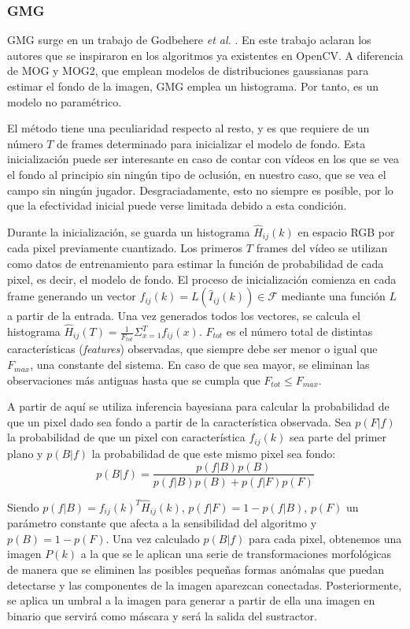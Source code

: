 \subsubsection*{GMG}
GMG surge en un trabajo de Godbehere \textit{et al.} \cite{art:Godbehere}. En este trabajo aclaran los autores que se inspiraron en los algoritmos ya existentes en OpenCV. A diferencia de MOG y MOG2, que emplean modelos de distribuciones gaussianas para estimar el fondo de la imagen, GMG emplea un histograma. Por tanto, es un modelo no paramétrico.

El método tiene una peculiaridad respecto al resto, y es que requiere de un número $T$ de frames determinado para inicializar el modelo de fondo. Esta inicialización puede ser interesante en caso de contar con vídeos en los que se vea el fondo al principio sin ningún tipo de oclusión, en nuestro caso, que se vea el campo sin ningún jugador. Desgraciadamente, esto no siempre es posible, por lo que la efectividad inicial puede verse limitada debido a esta condición.

Durante la inicialización, se guarda un histograma $\hat{H}_{ij}(k)$ en espacio RGB por cada pixel previamente cuantizado. Los primeros $T$ frames del vídeo se utilizan como datos de entrenamiento para estimar la función de probabilidad de cada pixel, es decir, el modelo de fondo. El proceso de inicialización comienza en cada frame generando un vector $f_{ij}(k) = L(\hat{I}_{ij}(k)) \in \mathcal{F}$ mediante una función $L$ a partir de la entrada. Una vez generados todos los vectores, se calcula el histograma $\hat{H}_{ij}(T) = \frac{1}{F_{tot}}\Sigma_{x = 1}^T f_{ij}(x)$. $F_{tot}$ es el número total de distintas características (\textit{features}) observadas, que siempre debe ser menor o igual que $F_{max}$, una constante del sistema. En caso de que sea mayor, se eliminan las observaciones más antiguas hasta que se cumpla que $F_{tot} \leq F_{max}$.

A partir de aquí se utiliza inferencia bayesiana para calcular la probabilidad de que un pixel dado sea fondo a partir de la característica observada. Sea $p(F|f)$ la probabilidad de que un pixel con característica $f_{ij}(k)$ sea parte del primer plano y $p(B|f)$ la probabilidad de que este mismo pixel sea fondo:
\[
    p(B|f) = \frac{p(f|B)p(B)}{p(f|B)p(B)+p(f|F)p(F)}
\]

Siendo $p(f|B) = f_{ij}(k)^T\hat{H}_{ij}(k)$, $p(f|F) = 1 - p(f|B)$, $p(F)$ un parámetro constante que afecta a la sensibilidad del algoritmo y $p(B) = 1 - p(F)$. Una vez calculado $p(B|f)$ para cada pixel, obtenemos una imagen $P(k)$ a la que se le aplican una serie de transformaciones morfológicas de manera que se eliminen las posibles pequeñas formas anómalas que puedan detectarse y las componentes de la imagen aparezcan conectadas. Posteriormente, se aplica un umbral a la imagen para generar a partir de ella una imagen en binario que servirá como máscara y será la salida del sustractor.

